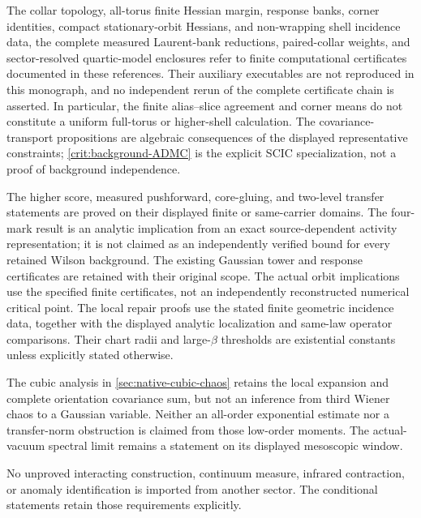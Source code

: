 \documentclass[11pt,oneside,openany]{book}
\theoremstyle{definition}
\theoremstyle{remark}
\begin{document}
The collar topology, all-torus finite Hessian margin, response banks,
corner identities, compact stationary-orbit Hessians, and non-wrapping
shell incidence data, the complete measured Laurent-bank reductions,
paired-collar weights, and sector-resolved quartic-model enclosures
refer to finite computational certificates documented
in these references. Their auxiliary executables are not reproduced in
this monograph, and no independent rerun of the complete certificate
chain is asserted. In particular, the finite alias--slice agreement and
corner means do not constitute a uniform full-torus or higher-shell
calculation. The covariance-transport propositions are algebraic
consequences of the displayed representative constraints;
\cref{crit:background-ADMC} is the explicit SCIC specialization, not a
proof of background independence.

The higher score, measured pushforward, core-gluing, and two-level
transfer statements are proved on their displayed finite or
same-carrier domains. The four-mark result is an analytic implication
from an exact source-dependent activity representation; it is not
claimed as an independently verified bound for every retained Wilson
background. The existing Gaussian tower and response certificates are
retained with their original scope. The actual orbit implications use
the specified finite certificates, not an independently reconstructed
numerical critical point. The local repair proofs use the stated
finite geometric incidence data, together with the displayed analytic
localization and same-law operator comparisons. Their chart radii and
large-$\beta$ thresholds are existential constants unless explicitly
stated otherwise.

The cubic analysis in \cref{sec:native-cubic-chaos} retains the
local expansion and complete orientation covariance sum, but not an
inference from third Wiener chaos to a Gaussian variable. Neither an
all-order exponential estimate nor a transfer-norm obstruction is
claimed from those low-order moments. The actual-vacuum spectral
limit remains a statement on its displayed mesoscopic window.

No unproved interacting construction, continuum measure, infrared
contraction, or anomaly identification is imported from another sector.
The conditional statements retain those requirements explicitly.

\backmatter
\end{document}
